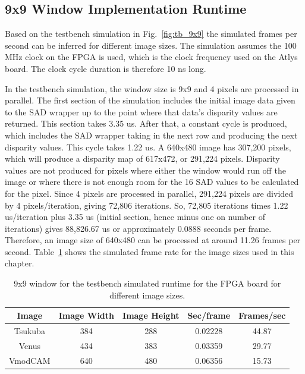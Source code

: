 \subsection{9x9 Window Implementation Runtime}
\label{sec:testbench9x9}

Based on the testbench simulation in Fig.~\ref{fig:tb_9x9} the simulated frames per second can be inferred for different image sizes. The simulation assumes the 100 MHz clock on the FPGA is used, which is the clock frequency used on the Atlys board. The clock cycle duration is therefore 10 ns long.

In the testbench simulation, the window size is 9x9 and 4 pixels are processed in parallel. The first section of the simulation includes the initial image data given to the SAD wrapper up to the point where that data's disparity values are returned. This section takes 3.35 us. After that, a constant cycle is produced, which includes the SAD wrapper taking in the next row and producing the next disparity values. This cycle takes 1.22 us. A 640x480 image has 307,200 pixels, which will produce a disparity map of 617x472, or 291,224 pixels. Disparity values are not produced for pixels where either the window would run off the image or where there is not enough room for the 16 SAD values to be calculated for the pixel. Since 4 pixels are processed in parallel, 291,224 pixels are divided by 4 pixels/iteration, giving 72,806 iterations. So, 72,805 iterations times 1.22 us/iteration plus 3.35 us (initial section, hence minus one on number of iterations) gives 88,826.67 us or approximately 0.0888 seconds per frame. Therefore, an image size of 640x480 can be processed at around 11.26 frames per second. Table~\ref{table:tb_9x9} shows the simulated frame rate for the image sizes used in this chapter.

\begin{table}
	\begin{center}
		\begin{tabular}{|c|c|c|c|c|}
			\hline 
				\rowstyle{\bfseries} Image & 
				\rowstyle{\bfseries} Image Width & 
				\rowstyle{\bfseries} Image Height & 
				\rowstyle{\bfseries} Sec/frame & 
				\rowstyle{\bfseries} Frames/sec
			\tabularnewline
			\hline 
			Tsukuba & 384 & 288 & 0.02228 & 44.87
			\tabularnewline
			\hline 
			Venus & 434 & 383 & 0.03359 & 29.77			
			\tabularnewline
			\hline 
			VmodCAM & 640 & 480 & 0.06356 & 15.73
			\tabularnewline
			\hline 			
			\end{tabular}
		\captionfonts
		\caption{9x9 window for the testbench simulated runtime for the FPGA board for different image sizes.}
		\label{table:tb_9x9}
	\end{center}
\end{table}

